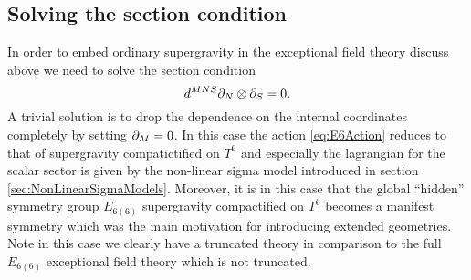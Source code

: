 \subsection{Solving the section condition}
In order to embed ordinary supergravity in the exceptional field theory discuss above we need to solve the section condition
\begin{equation}
    d^{MNS}\partial_N\otimes\partial_S = 0.
\end{equation}
A trivial solution is to drop the dependence on the internal coordinates completely by setting $\partial_M=0$. In this case the action \eqref{eq:E6Action} reduces to that of supergravity compatictified on $T^6$ and especially the lagrangian for the scalar sector is given by the non-linear sigma model introduced in section \ref{sec:NonLinearSigmaModels}. Moreover, it is in this case that the global ``hidden'' symmetry group $E_{6(6)}$ supergravity compactified on $T^6$  becomes a manifest symmetry which was the main motivation for introducing extended geometries. Note in this case we clearly have a truncated theory in comparison to the full $E_{6(6)}$ exceptional field theory which is not truncated. 

